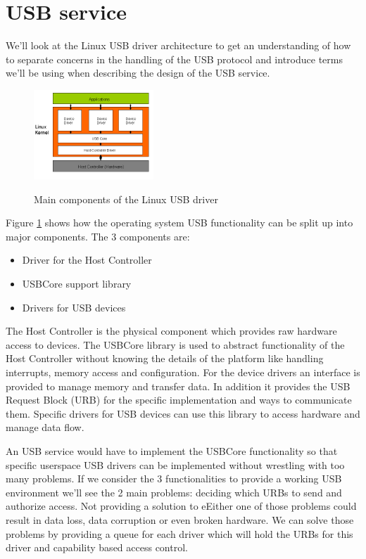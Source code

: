 \documentclass{acm_proc_article-sp}
\begin{document}
\section{USB service}
We'll look at the Linux USB driver architecture to get an understanding of how to separate concerns
in the handling of the USB protocol and introduce terms we'll be using when describing the design
of the USB service.
\begin{figure}
\centering
\includegraphics[width=0.4\textwidth]{usblinux.png}
\label{fig:usblinux}
\caption{Main components of the Linux USB driver}
\end{figure}
Figure \ref{fig:usblinux} shows how the operating system USB functionality can be split up into
major components.
The 3 components are:
\begin{itemize}
\item Driver for the Host Controller
\item USBCore support library
\item Drivers for USB devices
\end{itemize}
The Host Controller is the physical component which provides raw hardware access to devices.
The USBCore library is used to abstract functionality of the Host Controller without knowing
the details of the platform like handling interrupts, memory access and configuration.
For the device drivers an interface is provided to manage memory and transfer data.
In addition it provides the USB Request Block (URB) for the specific implementation and ways
to communicate them.
Specific drivers for USB devices can use this library to access hardware and manage data flow.

An USB service would have to implement the USBCore functionality so that specific userspace
USB drivers can be implemented without wrestling with too many problems.
If we consider the 3 functionalities to provide a working USB environment we'll see the 2
main problems: deciding which URBs to send and authorize access.
Not providing a solution to eEither one of those problems could result in data loss,
data corruption or even broken hardware.
We can solve those problems by providing a queue for each driver which will hold the URBs
for this driver and capability based access control.
\end{document}

